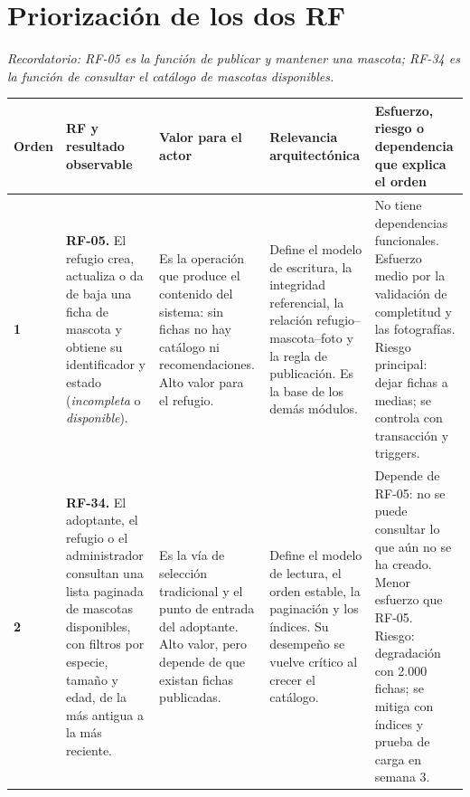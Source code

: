 \documentclass[11pt,a4paper]{article}
\newcommand{\thead}[1]{\textbf{#1}}
\begin{document}
\section{Priorización de los dos RF}

{\small\itshape Recordatorio: RF-05 es la función de publicar y mantener una mascota;
RF-34 es la función de consultar el catálogo de mascotas disponibles.\par}

\vspace{1mm}
{\footnotesize
\begin{tabularx}{\linewidth}{@{}V{0.35}V{1.25}V{1.1}V{1.1}V{1.2}@{}}
\toprule

\thead{Orden} & \thead{RF y resultado observable} & \thead{Valor para el actor} & \thead{Relevancia arquitectónica} & \thead{Esfuerzo, riesgo o dependencia que explica el orden} \\ \midrule

{\bfseries 1} &
\textbf{RF-05.} El refugio crea, actualiza o da de baja una ficha de mascota y
obtiene su identificador y estado (\emph{incompleta} o \emph{disponible}). &
Es la operación que produce el contenido del sistema: sin fichas no hay catálogo ni
recomendaciones. Alto valor para el refugio. &
Define el modelo de escritura, la integridad referencial, la relación refugio--mascota--foto
y la regla de publicación. Es la base de los demás módulos. &
No tiene dependencias funcionales. Esfuerzo medio por la validación de completitud y las
fotografías. Riesgo principal: dejar fichas a medias; se controla con transacción y triggers. \\

{\bfseries 2} &
\textbf{RF-34.} El adoptante, el refugio o el administrador consultan una lista
paginada de mascotas disponibles, con filtros por especie, tamaño y edad, de la más antigua
a la más reciente. &
Es la vía de selección tradicional y el punto de entrada del adoptante. Alto valor, pero
depende de que existan fichas publicadas. &
Define el modelo de lectura, el orden estable, la paginación y los índices. Su desempeño se
vuelve crítico al crecer el catálogo. &
Depende de RF-05: no se puede consultar lo que aún no se ha creado. Menor esfuerzo que
RF-05. Riesgo: degradación con 2.000 fichas; se mitiga con índices y prueba de carga en
semana 3. \\
\bottomrule
\end{tabularx}
}
\end{document}
